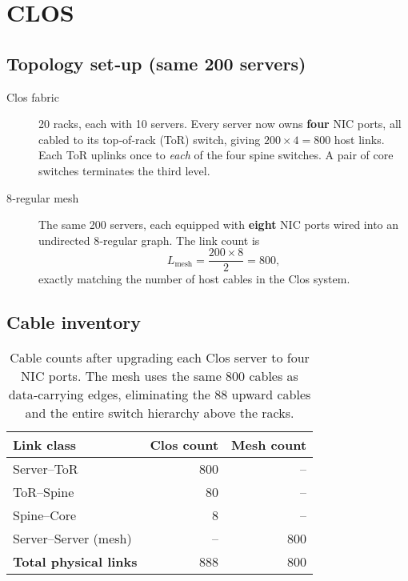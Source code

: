 \section{CLOS}

\subsection{Topology set‑up (same 200 servers)}

\begin{description}
  \item[Clos fabric] 20 racks, each with 10 servers. %
        Every server now owns \textbf{four} NIC ports, all cabled to its
        top‑of‑rack (ToR) switch, giving $200 \times 4 = 800$ host links. %
        Each ToR uplinks once to \emph{each} of the four spine switches. %
        A pair of core switches terminates the third level.

  \item[$8$‑regular mesh] The same 200 servers, each equipped with
        \textbf{eight} NIC ports wired into an undirected
        $8$‑regular graph. %
        The link count is
        \[
           L_{\text{mesh}} = \frac{200 \times 8}{2} = 800,
        \]
        exactly matching the number of host cables in the Clos system.
\end{description}

\subsection{Cable inventory}

\begin{table}[h]
\centering
\begin{tabular}{@{}lrr@{}}
\toprule
Link class & Clos count & Mesh count \\
\midrule
Server--ToR                       & 800 & --  \\
ToR--Spine                        &  80 & --  \\
Spine--Core                       &   8 & --  \\
Server--Server (mesh)             & --  & 800 \\[2pt]
\textbf{Total physical links}     & 888 & 800 \\
\bottomrule
\end{tabular}
\caption{Cable counts after upgrading each Clos server to four NIC
ports.  The mesh uses the same 800 cables as data‑carrying edges,
eliminating the 88 upward cables and the entire switch hierarchy
above the racks.}
\end{table}

